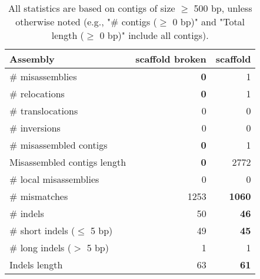 \documentclass[12pt,a4paper]{article}
\begin{document}
\begin{table}[ht]
\begin{center}
\caption{All statistics are based on contigs of size $\geq$ 500 bp, unless otherwise noted (e.g., "\# contigs ($\geq$ 0 bp)" and "Total length ($\geq$ 0 bp)" include all contigs).}
\begin{tabular}{|l*{2}{|r}|}
\hline
Assembly & scaffold broken & scaffold \\ \hline
\# misassemblies & {\bf 0} & 1 \\ \hline
\hspace{5mm}\# relocations & {\bf 0} & 1 \\ \hline
\hspace{5mm}\# translocations & 0 & 0 \\ \hline
\hspace{5mm}\# inversions & 0 & 0 \\ \hline
\# misassembled contigs & {\bf 0} & 1 \\ \hline
Misassembled contigs length & {\bf 0} & 2772 \\ \hline
\# local misassemblies & 0 & 0 \\ \hline
\# mismatches & 1253 & {\bf 1060} \\ \hline
\# indels & 50 & {\bf 46} \\ \hline
\hspace{5mm}\# short indels ($\leq$ 5 bp) & 49 & {\bf 45} \\ \hline
\hspace{5mm}\# long indels ($>$ 5 bp) & 1 & 1 \\ \hline
Indels length & 63 & {\bf 61} \\ \hline
\end{tabular}
\end{center}
\end{table}
\end{document}
